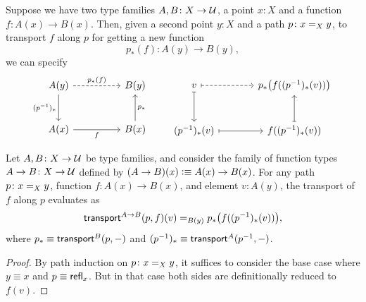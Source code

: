 \begin{rem}
    Suppose we have two type families $A,B\colon X\to\univ$, a point $x\colon X$ and a function $f\colon A(x)\to B(x)$. Then, given a second point $y\colon X$ and a path $p\colon x\eq Xy$, to transport $f$ along $p$ for getting a new function 
    \[
        p_*(f)\colon A(y)\to B(y),
    \]
    we can specify
    \[
        \begin{tikzcd}[column sep=huge, row sep=large]
            A(y)
                    \arrow[r,dashed,"p_*(f)"]
                    \arrow[d,"{(p^{-1})_*}"']
                &B(y)\\
            A(x)
                    \arrow[r,"f"']
                &B(x)
                    \arrow[u,"p_*"']
        \end{tikzcd}
        \qquad
        \begin{tikzcd}[column sep=large, row sep=large]
            v
                    \arrow[r,dashed,maps to]
                    \arrow[d,maps to]
                &{p_*\bigl(f((p^{-1})_*(v))\bigr)}\\
            {(p^{-1})_*(v)}
                    \arrow[r,maps to]
                &{f((p^{-1})_*(v))}
                    \arrow[u,maps to]
        \end{tikzcd}
    \]
\end{rem}

\begin{lem}\label{lem:transport^A->B}
    Let\/ $A, B\colon X\to\univ$ be type families, and consider the family of function types\/ $A\to B\colon X\to\univ$ defined by\/ $(A\to B)(x)\mathrel{\vcentcolon}\equiv A(x)\to B(x)$. For any path\/ $p\colon x\eq{X}y$, function\/ $f\colon A(x)\to B(x)$, and element\/ $v\colon A(y)$, the transport of\/ $f$ along\/ $p$ evaluates as
    \[
        \mathsf{transport}^{A\to B}(p,f)(v) \mathrel{=_{B(y)}} p_*\bigl(f((p^{-1})_*(v))\bigr),
    \]
    where\/ $p_*\equiv\mathsf{transport}^B(p,{\mathord-})$ and\/ $(p^{-1})_*\equiv\mathsf{transport}^A(p^{-1},{\mathord-})$.
\end{lem}

\begin{proof}
    By path induction on $p\colon x\eq Xy$, it suffices to consider the base case where $y\equiv x$ and $p\equiv\mathsf{refl}_x$. But in that case both sides are definitionally reduced to $f(v)$.
\end{proof}

